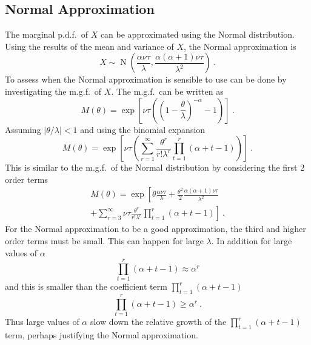 \documentclass[a4paper]{proc}
\DeclareMathOperator{\normal}{N}
\begin{document}
\subsection{Normal Approximation}
The marginal p.d.f.~of $X$ can be approximated using the Normal distribution. Using the results of the mean and variance of $X$, the Normal approximation is
\begin{equation}
X\sim\normal\left(\frac{\alpha\nu\tau}{\lambda},\frac{\alpha(\alpha+1)\nu\tau}{\lambda^2}\right) \ .
\end{equation}
To assess when the Normal approximation is sensible to use can be done by investigating the m.g.f.~of $X$. The m.g.f.~can be written as
\begin{equation*}
M(\theta)=\exp\left[\nu\tau\left(\left(1-\frac{\theta}{\lambda}\right)^{-\alpha}-1\right)\right] \ .
\end{equation*}
Assuming $|\theta/\lambda|<1$ and using the binomial expansion
\begin{equation}
M(\theta)=\exp\left[\nu\tau\left(
\sum_{r=1}^{\infty}\frac{\theta^r}{r!\lambda^r}\prod_{t=1}^{r}(\alpha+t-1)
\right)\right] \ .
\end{equation}
This is similar to the m.g.f.~of the Normal distribution by considering the first 2 order terms
\begin{multline}
M(\theta)=\exp\left[\theta\frac{\alpha\nu\tau}{\lambda}+\frac{\theta^2}{2}\frac{\alpha(\alpha+1)\nu\tau}{\lambda^2}
\right.\\\left.
+\sum_{r=3}^\infty\nu\tau\frac{\theta^r}{r!\lambda^r}\prod_{t=1}^{r}(\alpha+t-1)
\right] \ .
\end{multline}
For the Normal approximation to be a good approximation, the third and higher order terms must be small. This can happen for large $\lambda$. In addition for large values of $\alpha$ 
\begin{equation}
\prod_{t=1}^{r}(\alpha+t-1)\approx\alpha^r
\end{equation}
and this is smaller than the coefficient term $\prod_{t=1}^{r}(\alpha+t-1)$
\begin{equation}
\prod_{t=1}^{r}(\alpha+t-1) \geqslant \alpha^r \ .
\end{equation}
Thus large values of $\alpha$ slow down the relative growth of the $\prod_{t=1}^{r}(\alpha+t-1)$ term, perhaps justifying the Normal approximation.
\end{document}

